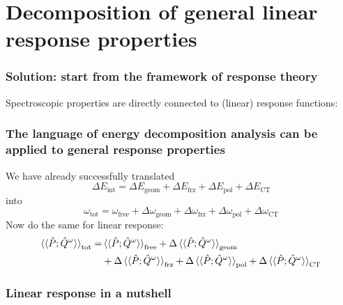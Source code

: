 \documentclass[%
    xcolor=usenames,dvipsnames,svgnames%
]{beamer}
\begin{document}
\section{Decomposition of general linear response properties}

\begin{frame}
  \frametitle{Solution: start from the framework of response theory}
  Spectroscopic properties are directly connected to (linear) response functions:
\end{frame}

\begin{frame}
  \frametitle{The language of energy decomposition analysis can be applied to general response properties}
  We have already successfully translated
  \begin{equation*}
    \Delta E_{\text{int}} = \Delta E_{\text{geom}} + \Delta E_{\text{frz}} + \Delta E_{\text{pol}} + \Delta E_{\text{CT}}
  \end{equation*}
  into
  \begin{equation*}
    \omega_{\text{tot}} = \omega_{\text{free}} + \Delta \omega_{\text{geom}} + \Delta \omega_{\text{frz}} + \Delta \omega_{\text{pol}} + \Delta \omega_{\text{CT}}
  \end{equation*}
  Now do the same for linear response:
  \begin{equation*}
    \begin{aligned}
      \braket{\braket{\hat{P};\hat{Q}^{\omega}}}_{\text{tot}} = &\braket{\braket{\hat{P};\hat{Q}^{\omega}}}_{\text{free}} + \Delta \braket{\braket{\hat{P};\hat{Q}^{\omega}}}_{\text{geom}} \\
      &+ \Delta \braket{\braket{\hat{P};\hat{Q}^{\omega}}}_{\text{frz}} + \Delta \braket{\braket{\hat{P};\hat{Q}^{\omega}}}_{\text{pol}} + \Delta \braket{\braket{\hat{P};\hat{Q}^{\omega}}}_{\text{CT}}
    \end{aligned}
  \end{equation*}
\end{frame}

\begin{frame}
  \frametitle{Linear response in a nutshell}
\end{frame}
\end{document}
